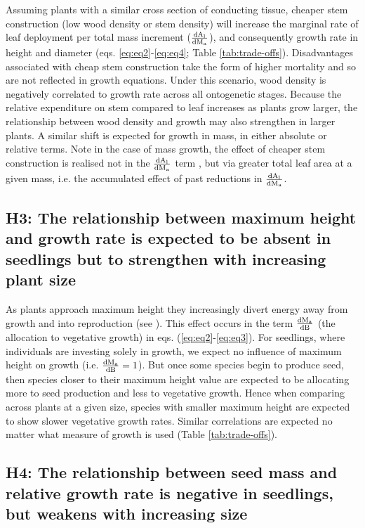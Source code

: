 \documentclass[a4paper,11pt]{article}
\begin{document}
Assuming plants with a similar cross section of conducting tissue, cheaper stem construction (low wood density or stem density) will increase the marginal rate of leaf deployment per total mass increment ($\frac{\rm{d} A_{\rm l}}{\rm{d} M_{\rm a} }$), and consequently growth rate in height and diameter (eqs. \ref{eq:eq2}-\ref{eq:eq4}; Table \ref{tab:trade-offs}). Disadvantages associated with cheap stem construction take the form of higher mortality and so are not reflected in growth equations. Under this scenario, wood density is negatively correlated to growth rate across all ontogenetic stages. Because the relative expenditure on stem compared to leaf increases as plants grow larger, the relationship between wood density and growth may also strengthen in larger plants. A similar shift is expected for growth in mass, in either absolute or relative terms. Note in the case of mass growth, the effect of cheaper stem construction is realised not in the $\frac{\rm{d} A_{\rm l}}{\rm{d} M_{\rm a} }$ term , but via greater total leaf area at a given mass, i.e. the accumulated effect of past reductions in  $\frac{\rm{d} A_{\rm l}}{\rm{d} M_{\rm a} }$.

\subsection*{H3: The relationship between maximum height and growth rate is expected to be absent in seedlings but to strengthen with increasing plant size}

As plants approach maximum height they increasingly divert energy away from growth and into reproduction (see \citealt{Thomas:1996do,Thomas-2011, Wenk:2015jz}). This effect occurs in the term $\frac{\rm{d} M_{\rm a} }{\rm{d} B}$ (the allocation to vegetative growth) in eqs. (\ref{eq:eq2}-\ref{eq:eq3}). For seedlings, where individuals are investing solely in growth, we expect no influence of maximum height on growth (i.e. $\frac{\rm{d} M_{\rm a} }{\rm{d} B} =1$). But once some species begin to produce seed, then species closer to their maximum height value are expected to be allocating more to seed production and less to vegetative growth. Hence when comparing across plants at a given size, species with smaller maximum height are expected to show slower vegetative growth rates. Similar correlations are expected no matter what measure of growth is used (Table \ref{tab:trade-offs}).

\subsection*{H4: The relationship between seed mass and relative growth rate is negative in seedlings, but weakens with increasing size}
\end{document}

